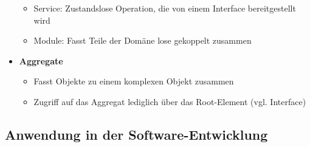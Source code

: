 \begin{itemize}
\begin{itemize}
\begin{description}
		\end{description}
		\item Service: Zustandslose Operation, die von einem Interface bereitgestellt wird
		\item Module: Fasst Teile der Domäne lose gekoppelt zusammen
	\end{itemize}
	\item \textbf{Aggregate}
	\begin{itemize}
		\item Fasst Objekte zu einem komplexen Objekt zusammen
		\item Zugriff auf das Aggregat lediglich über das Root-Element (vgl. Interface)
	\end{itemize}
\end{itemize}


\subsection{Anwendung in der Software-Entwicklung}
